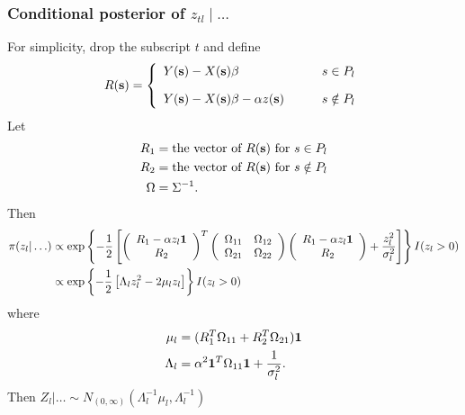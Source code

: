 \subsubsection*{Conditional posterior of $z_{tl} \mid \ldots $}\label{s:mvcondu}
For simplicity, drop the subscript $t$ and define 
\begin{align*}
R(\mbox{\bf s}) = \left\{ 
    \begin{array}{ll}
        Y(\mbox{\bf s}) - X(\mbox{\bf s}) \beta &s \in P_l\\[1em]
        Y(\mbox{\bf s}) - X(\mbox{\bf s}) \beta - \alpha z(\mbox{\bf s}) \qquad & s \notin P_l
    \end{array} 
\right.
\end{align*}
Let 
\begin{align*}
    R_1 &= \text{the vector of } R(\mbox{\bf s}) \text{ for } s \in P_l \\
    R_2 &= \text{the vector of } R(\mbox{\bf s}) \text{ for } s \notin P_l \\
    \Omega &= \Sigma^{-1}.
\end{align*}
Then
\begin{align*}
    \pi(z_l | \ldots) &\propto \exp \left\{ -\frac{ 1 }{ 2 } \left[
        \left( \begin{array}{c}
            R_1 - \alpha z_l \mbox{\boldmath $1$}\\
            R_2
        \end{array} \right)^T
        \left( \begin{array}{cc}
            \Omega_{11} & \Omega_{12}\\
            \Omega_{21} & \Omega_{22}
        \end{array} \right)
        \left( \begin{array}{c}
            R_1 - \alpha z_l \mbox{\boldmath $1$}\\
            R_2
        \end{array} \right)
        +  \frac{ z_l^2 }{ \sigma_l^2 }\right]
    \right\} I(z_l > 0) \\
        &\propto \exp \left\{ -\frac{ 1 }{ 2 } \left[ \Lambda_l z_l^2 - 2 \mu_l z_l \right] \right\} I(z_l > 0)
\end{align*}
where
\begin{align*}
    \mu_l &= ( R_1^T \Omega_{11} + R_2^T \Omega_{21} )\mbox{\boldmath $1$}\\
    \Lambda_l &= \alpha^2 \mbox{\boldmath $1$}^T \Omega_{11} \mbox{\boldmath $1$} + \frac{ 1 }{ \sigma^2_l }.
\end{align*}
Then $Z_l | \ldots \sim N_{(0, \infty)} (\Lambda_l^{-1} \mu_l, \Lambda_l^{-1})$